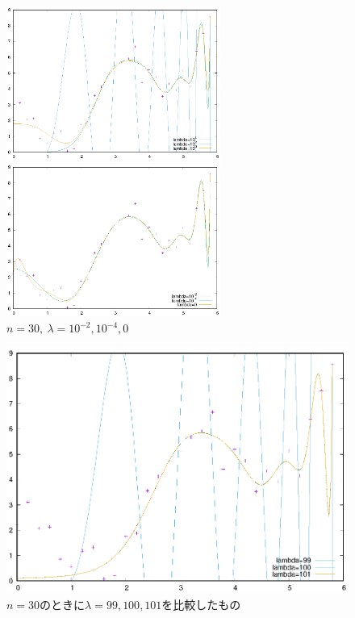 \documentclass[dvipdfmx,autodetect-engine]{jsarticle}%
\begin{document}
\begin{figure}[htbp]
 \begin{minipage}{0.5\hsize}
  \begin{center}
   \includegraphics[width=70mm]{30_big.eps}
  \end{center}
  \caption{$n=30,~\lambda = 10^4,10^2,10^0$}
  \label{}
 \end{minipage}
 \begin{minipage}{0.5\hsize}
  \begin{center}
   \includegraphics[width=70mm]{30_small.eps}
  \end{center}
  \caption{$n=30,~\lambda = 10^{-2},10^{-4},0$}
  \label{30_small}
 \end{minipage}
\end{figure}

\begin{figure}[htbp]
\centering 
\includegraphics[width=120mm]{99100101.eps}
\caption{$n=30$のときに$\lambda = 99,100,101$を比較したもの}
\label{99100101}
\end{figure}
\end{document}
